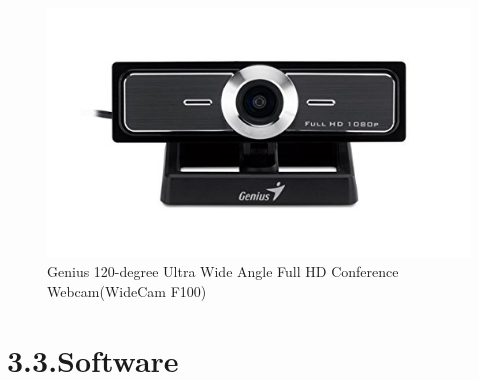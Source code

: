 \begin{figure}
	\centering
	\hspace*{0cm}   
	\includegraphics[width=150mm,scale=1]{./Bilder/Genius_F100_camera.png}
	\caption{Genius 120-degree Ultra Wide Angle Full HD Conference Webcam(WideCam F100) }
\end{figure}


%
\section*{3.3.Software}\label{sec:Software}
%



